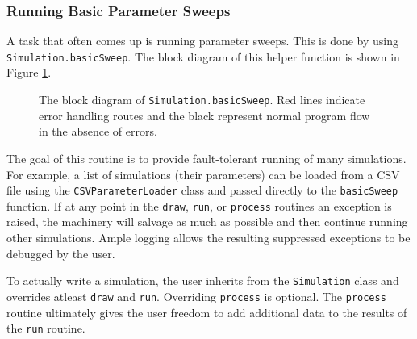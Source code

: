 \documentclass[12pt]{article}
\begin{document}
\subsubsection{Running Basic Parameter Sweeps}
A task that often comes up is running parameter sweeps. This is done by using \texttt{Simulation.basicSweep}. The block diagram of this helper function is shown in Figure \ref{fig.basic_sweep_blocks}.
\begin{figure}
\caption{The block diagram of \texttt{Simulation.basicSweep}. Red lines indicate error handling routes and the black represent normal program flow in the absence of errors.}
\label{fig.basic_sweep_blocks}
\end{figure}
The goal of this routine is to provide fault-tolerant running of many simulations. For example, a list of simulations (their parameters) can be loaded from a CSV file using the \texttt{CSVParameterLoader} class and passed directly to the \texttt{basicSweep} function. If at any point in the \texttt{draw}, \texttt{run}, or \texttt{process} routines an exception is raised, the machinery will salvage as much as possible and then continue running other simulations. Ample logging allows the resulting suppressed exceptions to be debugged by the user. 

To actually write a simulation, the user inherits from the \texttt{Simulation} class and overrides atleast \texttt{draw} and \texttt{run}. Overriding \texttt{process} is optional. The \texttt{process} routine ultimately gives the user freedom to add additional data to the results of the \texttt{run} routine.
\end{document}
